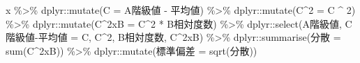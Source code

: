 \documentclass[
  12pt,
]{book}
\newenvironment{Shaded}{\begin{snugshade}}{\end{snugshade}}
\newcommand{\AttributeTok}[1]{\textcolor[rgb]{0.77,0.63,0.00}{#1}}
\newcommand{\DecValTok}[1]{\textcolor[rgb]{0.00,0.00,0.81}{#1}}
\newcommand{\FunctionTok}[1]{\textcolor[rgb]{0.00,0.00,0.00}{#1}}
\newcommand{\NormalTok}[1]{#1}
\newcommand{\OtherTok}[1]{\textcolor[rgb]{0.56,0.35,0.01}{#1}}
\newcommand{\SpecialCharTok}[1]{\textcolor[rgb]{0.00,0.00,0.00}{#1}}
\newcommand{\StringTok}[1]{\textcolor[rgb]{0.31,0.60,0.02}{#1}}
\begin{document}
\begin{Shaded}
\begin{Highlighting}[]
\NormalTok{x }\SpecialCharTok{\%\textgreater{}\%} 
\NormalTok{  dplyr}\SpecialCharTok{::}\FunctionTok{mutate}\NormalTok{(}\StringTok{\textasciigrave{}}\AttributeTok{C}\StringTok{\textasciigrave{}} \OtherTok{=} \StringTok{\textasciigrave{}}\AttributeTok{A階級値}\StringTok{\textasciigrave{}} \SpecialCharTok{{-}} \StringTok{\textasciigrave{}}\AttributeTok{平均値}\StringTok{\textasciigrave{}}\NormalTok{) }\SpecialCharTok{\%\textgreater{}\%} 
\NormalTok{  dplyr}\SpecialCharTok{::}\FunctionTok{mutate}\NormalTok{(}\StringTok{\textasciigrave{}}\AttributeTok{C\^{}2}\StringTok{\textasciigrave{}} \OtherTok{=} \StringTok{\textasciigrave{}}\AttributeTok{C}\StringTok{\textasciigrave{}} \SpecialCharTok{\^{}} \DecValTok{2}\NormalTok{) }\SpecialCharTok{\%\textgreater{}\%} 
\NormalTok{  dplyr}\SpecialCharTok{::}\FunctionTok{mutate}\NormalTok{(}\StringTok{\textasciigrave{}}\AttributeTok{C\^{}2xB}\StringTok{\textasciigrave{}} \OtherTok{=} \StringTok{\textasciigrave{}}\AttributeTok{C\^{}2}\StringTok{\textasciigrave{}} \SpecialCharTok{*} \StringTok{\textasciigrave{}}\AttributeTok{B相対度数}\StringTok{\textasciigrave{}}\NormalTok{) }\SpecialCharTok{\%\textgreater{}\%} 
\NormalTok{  dplyr}\SpecialCharTok{::}\FunctionTok{select}\NormalTok{(}\StringTok{\textasciigrave{}}\AttributeTok{A階級値}\StringTok{\textasciigrave{}}\NormalTok{, }\StringTok{\textasciigrave{}}\AttributeTok{C階級値{-}平均値}\StringTok{\textasciigrave{}} \OtherTok{=} \StringTok{\textasciigrave{}}\AttributeTok{C}\StringTok{\textasciigrave{}}\NormalTok{, }\StringTok{\textasciigrave{}}\AttributeTok{C\^{}2}\StringTok{\textasciigrave{}}\NormalTok{, }\StringTok{\textasciigrave{}}\AttributeTok{B相対度数}\StringTok{\textasciigrave{}}\NormalTok{, }\StringTok{\textasciigrave{}}\AttributeTok{C\^{}2xB}\StringTok{\textasciigrave{}}\NormalTok{) }\SpecialCharTok{\%\textgreater{}\%} 
\NormalTok{  dplyr}\SpecialCharTok{::}\FunctionTok{summarise}\NormalTok{(}\StringTok{\textasciigrave{}}\AttributeTok{分散}\StringTok{\textasciigrave{}} \OtherTok{=} \FunctionTok{sum}\NormalTok{(}\StringTok{\textasciigrave{}}\AttributeTok{C\^{}2xB}\StringTok{\textasciigrave{}}\NormalTok{)) }\SpecialCharTok{\%\textgreater{}\%} 
\NormalTok{  dplyr}\SpecialCharTok{::}\FunctionTok{mutate}\NormalTok{(}\StringTok{\textasciigrave{}}\AttributeTok{標準偏差}\StringTok{\textasciigrave{}} \OtherTok{=} \FunctionTok{sqrt}\NormalTok{(}\StringTok{\textasciigrave{}}\AttributeTok{分散}\StringTok{\textasciigrave{}}\NormalTok{))}
\end{Highlighting}
\end{Shaded}
\end{document}
